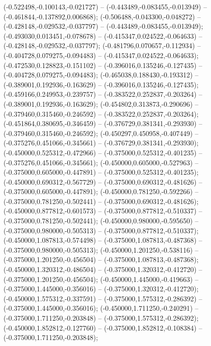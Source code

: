 (-0.522498,-0.100143,-0.021727) -- (-0.443489,-0.083455,-0.013949) -- (-0.461844,-0.137892,0.006868);
 (-0.506488,-0.043300,-0.048272) -- (-0.428148,-0.029532,-0.037797) -- (-0.443489,-0.083455,-0.013949);
 (-0.493030,0.013451,-0.078678) -- (-0.415347,0.024522,-0.064633) -- (-0.428148,-0.029532,-0.037797);
 (-0.481796,0.070657,-0.112934) -- (-0.404728,0.079275,-0.094483) -- (-0.415347,0.024522,-0.064633);
 (-0.472530,0.128823,-0.151102) -- (-0.396016,0.135246,-0.127435) -- (-0.404728,0.079275,-0.094483);
 (-0.465038,0.188430,-0.193312) -- (-0.389001,0.192936,-0.163629) -- (-0.396016,0.135246,-0.127435);
 (-0.459166,0.249953,-0.239757) -- (-0.383522,0.252837,-0.203264) -- (-0.389001,0.192936,-0.163629);
 (-0.454802,0.313873,-0.290696) -- (-0.379460,0.315460,-0.246592) -- (-0.383522,0.252837,-0.203264);
 (-0.451864,0.380695,-0.346459) -- (-0.376729,0.381341,-0.293930) -- (-0.379460,0.315460,-0.246592);
 (-0.450297,0.450958,-0.407449) -- (-0.375276,0.451066,-0.345661) -- (-0.376729,0.381341,-0.293930);
 (-0.450000,0.525312,-0.472966) -- (-0.375000,0.525312,-0.401235) -- (-0.375276,0.451066,-0.345661);
 (-0.450000,0.605000,-0.527963) -- (-0.375000,0.605000,-0.447891) -- (-0.375000,0.525312,-0.401235);
 (-0.450000,0.690312,-0.567729) -- (-0.375000,0.690312,-0.481626) -- (-0.375000,0.605000,-0.447891);
 (-0.450000,0.781250,-0.592266) -- (-0.375000,0.781250,-0.502441) -- (-0.375000,0.690312,-0.481626);
 (-0.450000,0.877812,-0.601573) -- (-0.375000,0.877812,-0.510337) -- (-0.375000,0.781250,-0.502441);
 (-0.450000,0.980000,-0.595650) -- (-0.375000,0.980000,-0.505313) -- (-0.375000,0.877812,-0.510337);
 (-0.450000,1.087813,-0.574498) -- (-0.375000,1.087813,-0.487368) -- (-0.375000,0.980000,-0.505313);
 (-0.450000,1.201250,-0.538116) -- (-0.375000,1.201250,-0.456504) -- (-0.375000,1.087813,-0.487368);
 (-0.450000,1.320312,-0.486504) -- (-0.375000,1.320312,-0.412720) -- (-0.375000,1.201250,-0.456504);
 (-0.450000,1.445000,-0.419663) -- (-0.375000,1.445000,-0.356016) -- (-0.375000,1.320312,-0.412720);
 (-0.450000,1.575312,-0.337591) -- (-0.375000,1.575312,-0.286392) -- (-0.375000,1.445000,-0.356016);
 (-0.450000,1.711250,-0.240291) -- (-0.375000,1.711250,-0.203848) -- (-0.375000,1.575312,-0.286392);
 (-0.450000,1.852812,-0.127760) -- (-0.375000,1.852812,-0.108384) -- (-0.375000,1.711250,-0.203848);
